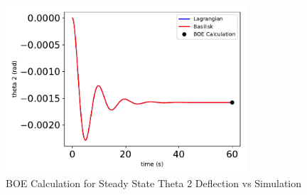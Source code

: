 \begin{figure}[htbp]\centerline{\includegraphics[width=0.8\textwidth]{AutoTeX/BOECalculationForSteadyStateTheta2DeflectionVsSimulation}}\caption{BOE Calculation for Steady State Theta 2 Deflection vs Simulation}\label{fig:BOECalculationForSteadyStateTheta2DeflectionVsSimulation}\end{figure}